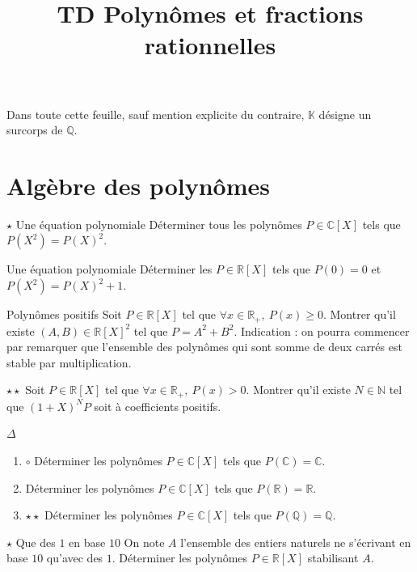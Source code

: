 \documentclass[french,a4paper]{article}
\title{TD Polynômes et fractions rationnelles}
\newcommand{\N}{\mathbb{N}}
\newcommand{\Q}{\mathbb{Q}}
\newcommand{\R}{\mathbb{R}}
\newcommand{\C}{\mathbb{C}}
\newcommand{\K}{\mathbb{K}}
\theoremstyle{plain}
\theoremstyle{definition}
\theoremstyle{remark}
\begin{document}
\maketitle

Dans toute cette feuille, sauf mention explicite du contraire, $\K$ désigne un surcorps de $\Q$.

\section{Algèbre des polynômes}

\begin{ex}[Moulin.01]{$\star$ Une équation polynomiale}
	Déterminer tous les polynômes $P\in\C[X]$ tels que $P(X^2)=P(X)^2$.
\end{ex}

\begin{ex}[Moulin.02]{Une équation polynomiale}
	Déterminer les $P\in\R[X]$ tels que $P(0)=0$ et $P(X^2)=P(X)^2+1$.
\end{ex}

\begin{ex}[Moulin.03]{Polynômes positifs}
	Soit $P\in\R[X]$ tel que $\forall x\in\R_+,\ P(x)\geqslant 0$. Montrer qu'il existe $(A,B)\in\R[X]^2$ tel que $P=A^2+B^2$. Indication : on pourra commencer par remarquer que l'ensemble des polynômes qui sont somme de deux carrés est stable par multiplication.
\end{ex}

\begin{ex}[Moulin.04]{$\star\star$}
	Soit $P\in\R[X]$ tel que $\forall x\in\R_+,\ P(x)>0$. Montrer qu'il existe $N\in\N$ tel que $(1+X)^NP$ soit à coefficients positifs.
\end{ex}

\begin{ex}[Moulin.05]{$\Delta$}
	\begin{enumerate}
		\item $\circ$ Déterminer les polynômes $P\in\C[X]$ tels que $P(\C)=\C$.
		\item Déterminer les polynômes $P\in\C[X]$ tels que $P(\R)=\R$.
		\item $\star\star$ Déterminer les polynômes $P\in\C[X]$ tels que $P(\Q)=\Q$.
	\end{enumerate}
\end{ex}

\begin{ex}[Moulin.06]{$\star$ Que des $1$ en base $10$}
	On note $A$ l'ensemble des entiers naturels ne s'écrivant en base $10$ qu'avec des $1$. Déterminer les polynômes $P\in\R[X]$ stabilisant $A$.
\end{ex}
\end{document}
